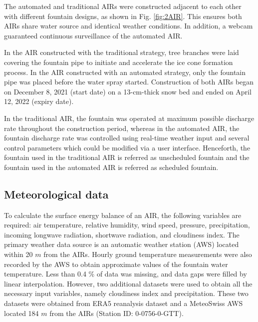 \documentclass[tc, manuscript]{copernicus}
\begin{document}
The automated and traditional AIRs were constructed adjacent to each other with different fountain
designs, as shown in Fig. \ref{fig:2AIR}. This ensures both AIRs share water source and identical
weather conditions. In addition, a webcam guaranteed continuous surveillance of the automated AIR.   

In the AIR constructed with the traditional strategy, tree branches were laid covering the fountain pipe to
initiate and accelerate the ice cone formation process. In the AIR constructed with an automated strategy, only
the fountain pipe was placed before the water spray started. Construction of both AIRs began on December 8, 2021
(start date) on a 13-cm-thick snow bed and ended on April 12, 2022 (expiry date).

In the traditional AIR, the fountain was operated at maximum possible discharge rate throughout the construction
period, whereas in the automated AIR, the fountain discharge rate was controlled using real-time weather input
and several control parameters which could be modified via a user interface. Henceforth, the fountain used in
the traditional AIR is referred as unscheduled fountain and the fountain used in the automated AIR is referred
as scheduled fountain.

\subsection{Meteorological data}

To calculate the surface energy balance of an AIR, the following variables are required: air temperature,
relative humidity, wind speed, pressure, precipitation, incoming longwave radiation, shortwave radiation, and
cloudiness index. The primary weather data source is an automatic weather station (AWS) located within 20 $m$
from the AIRs. Hourly ground temperature measurements were also recorded by the AWS to obtain approximate values
of the fountain water temperature. Less than 0.4 \% of data was missing, and data gaps were filled by linear
interpolation. However, two additional datasets were used to obtain all the necessary input variables, namely
cloudiness index and precipitation. These two datasets were obtained from ERA5 reanalysis dataset
\citep{hersbachERA5GlobalReanalysis2020} and a MeteoSwiss AWS located 184 $m$ from the AIRs (Station ID:
0-0756-0-GTT).
\end{document}
